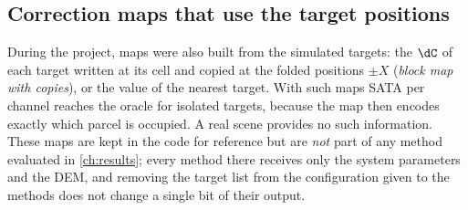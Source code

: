 \subsection{Correction maps that use the target positions}\label{sec:sata-maps}

During the project, maps were also built from the simulated targets: the $\dC$ of each target written at its cell and
copied at the folded positions $\pm X$ (\emph{block map with copies}), or the value of the nearest target. With such maps
SATA per channel reaches the oracle for isolated targets, because the map then encodes exactly which parcel is occupied.
A real scene provides no such information. These maps are kept in the code for reference but are \emph{not} part of any
method evaluated in \cref{ch:results}; every method there receives only the system parameters and the DEM, and removing the
target list from the configuration given to the methods does not change a single bit of their output.
